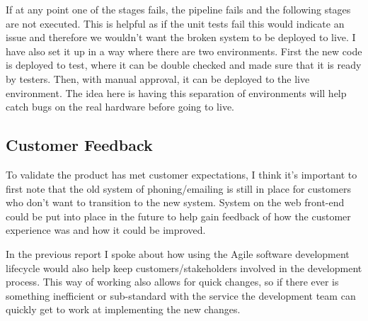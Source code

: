   If at any point one of the stages fails, the pipeline fails and the following stages are not executed. This is helpful as if the unit tests fail this would
  indicate an issue and therefore we wouldn't want the broken system to be deployed to live. I have also set it up in a way where there are two environments.
  First the new code is deployed to test, where it can be double checked and made sure that it is ready by testers. Then, with manual approval, it can be 
  deployed to the live environment. The idea here is having this separation of environments will help catch bugs on the real hardware before going to live.

  \subsection{Customer Feedback}
  To validate the product has met customer expectations, I think it's important to first note that the old system of phoning/emailing is still in 
  place for customers who don't want to transition to the new system. System on the web front-end could be put into place in the future to help 
  gain feedback of how the customer experience was and how it could be improved.

  In the previous report I spoke about how using the Agile software development lifecycle would also help keep customers/stakeholders involved in the 
  development process. This way of working also allows for quick changes, so if there ever is something inefficient or sub-standard with the service the 
  development team can quickly get to work at implementing the new changes.

\newpage